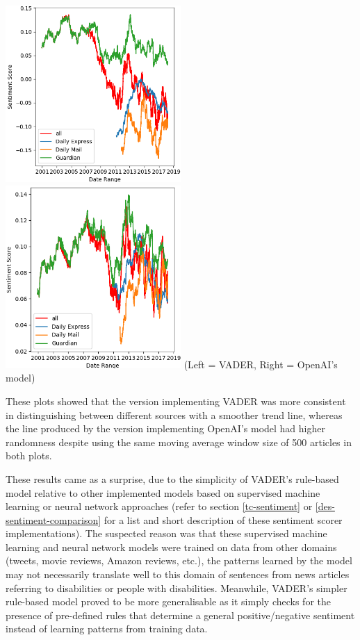 \documentclass{report}
\begin{document}
\noindent
\includegraphics[width=0.5\textwidth]{vader.png}
\includegraphics[width=0.5\textwidth]{openai.png}
(Left = VADER, Right = OpenAI's model)
\vspace{0.5em}

These plots showed that the version implementing VADER was more consistent in distinguishing between different sources with a smoother trend line, whereas the line produced by the version implementing OpenAI's model had higher randomness despite using the same moving average window size of 500 articles in both plots.

These results came as a surprise, due to the simplicity of VADER's rule-based model relative to other implemented models based on supervised machine learning or neural network approaches (refer to section \ref{tc-sentiment} or \ref{des-sentiment-comparison} for a list and short description of these sentiment scorer implementations).
The suspected reason was that these supervised machine learning and neural network models were trained on data from other domains (tweets, movie reviews, Amazon reviews, etc.), the patterns learned by the model may not necessarily translate well to this domain of sentences from news articles referring to disabilities or people with disabilities. 
Meanwhile, VADER's simpler rule-based model proved to be more generalisable as it simply checks for the presence of pre-defined rules that determine a general positive/negative sentiment instead of learning patterns from training data.
\end{document}
